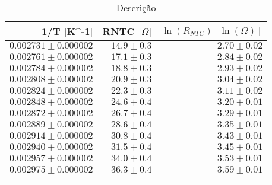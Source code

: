 
        \def\arraystretch{1.2}
        \begin{table}[H]
            \centering
            \caption{Descrição}
            \begin{tabular}{r|r|r}
            \toprule
            \midrule
1/T [K^-1] & RNTC [$\Omega$] & $\ln (R_{NTC}) [\ln (\Omega)]$ \\\hline
$0.002731 \pm 0.000002$ & $14.9 \pm 0.3$ & $2.70 \pm 0.02$ \\
$0.002761 \pm 0.000002$ & $17.1 \pm 0.3$ & $2.84 \pm 0.02$ \\
$0.002784 \pm 0.000002$ & $18.8 \pm 0.3$ & $2.93 \pm 0.02$ \\
$0.002808 \pm 0.000002$ & $20.9 \pm 0.3$ & $3.04 \pm 0.02$ \\
$0.002824 \pm 0.000002$ & $22.3 \pm 0.3$ & $3.11 \pm 0.02$ \\
$0.002848 \pm 0.000002$ & $24.6 \pm 0.4$ & $3.20 \pm 0.01$ \\
$0.002872 \pm 0.000002$ & $26.7 \pm 0.4$ & $3.29 \pm 0.01$ \\
$0.002889 \pm 0.000002$ & $28.6 \pm 0.4$ & $3.35 \pm 0.01$ \\
$0.002914 \pm 0.000002$ & $30.8 \pm 0.4$ & $3.43 \pm 0.01$ \\
$0.002940 \pm 0.000002$ & $31.5 \pm 0.4$ & $3.45 \pm 0.01$ \\
$0.002957 \pm 0.000002$ & $34.0 \pm 0.4$ & $3.53 \pm 0.01$ \\
$0.002975 \pm 0.000002$ & $36.3 \pm 0.4$ & $3.59 \pm 0.01$ \\
            \bottomrule
            \label{etiqueta}
            \end{tabular}
        \end{table}

